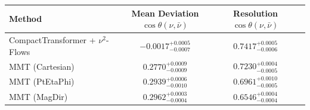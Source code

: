     \begin{tabular}{lccc}
        \toprule
        Method & Mean Deviation $\cos\theta(\nu, \bar{\nu})$ & Resolution $\cos\theta(\nu, \bar{\nu})$ \\
        \midrule
        CompactTransformer + $\nu^2$-Flows & $-0.0017^{+0.0005}_{-0.0007}$ & $0.7417^{+0.0005}_{-0.0006}$ \\
        MMT (Cartesian) & $0.2770^{+0.0009}_{-0.0009}$ & $0.7230^{+0.0004}_{-0.0005}$ \\
        MMT (PtEtaPhi) & $0.2939^{+0.0006}_{-0.0010}$ & $0.6961^{+0.0010}_{-0.0005}$ \\
        MMT (MagDir) & $0.2962^{+0.0003}_{-0.0004}$ & $0.6546^{+0.0004}_{-0.0004}$ \\
        \bottomrule
    \end{tabular}